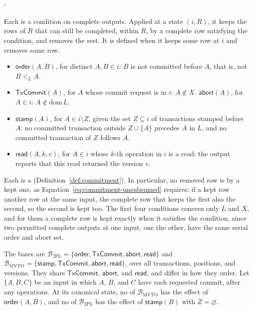 \paragraph{\Commitments.}
Each \commitment is a condition on complete outputs.  Applied at a state
$(i,R)$, it keeps the rows of $R$ that can still be completed, within $R$, by a
complete row satisfying the condition, and removes the rest.  It is defined
when it keeps some row at $i$ and removes some row.
\begin{itemize}
  \item $\mathsf{order}(A,B)$, for distinct $A,B\in i$: $B$ is not committed
        before $A$, that is, not $B<_L A$.
  \item $\mathsf{TxCommit}(A)$, for $A$ whose commit request is in $i$:
        $A\notin X$.\quad
        $\mathsf{abort}(A)$, for $A\in i$: $A\notin\mathrm{dom}\,L$.
  \item $\mathsf{stamp}(A)$, for $A\in i\setminus Z$, given the set $Z\subseteq
        i$ of transactions stamped before $A$: no committed transaction outside
        $Z\cup\{A\}$ precedes $A$ in $L$, and no committed transaction of $Z$
        follows $A$.
  \item $\mathsf{read}(A,k,v)$, for $A\in i$ whose $k$-th operation in $i$ is a
        read: the output reports that this read returned the version $v$.
\end{itemize}
Each is a \commitment (Definition~\ref{def:commitment}).  In particular, no
removed row is \outrelpast by a kept one, as
Equation~\ref{eq:commitment-unsubsumed} requires: if a kept row \outrel another
row at the same input, the complete row that keeps the first also \outrel the
second, so the second is kept too.  The first four conditions concern only $L$
and $X$, and for them a complete row is kept exactly when it satisfies the
condition, since two permitted complete outputs at one input, one
\outrelpart the other, have the same serial order and abort set.

The bases are
$\mathcal B_{\mathrm{2PL}}=\{\mathsf{order},\mathsf{TxCommit},\mathsf{abort},\mathsf{read}\}$
and
$\mathcal B_{\mathrm{MVTO}}=\{\mathsf{stamp},\mathsf{TxCommit},\mathsf{abort},\mathsf{read}\}$,
over all transactions, positions, and versions.  They share
$\mathsf{TxCommit}$, $\mathsf{abort}$, and $\mathsf{read}$, and differ in how
they order.  Let $\{A,B,C\}$ be an input in which $A$, $B$, and $C$ have each
requested commit, after any operations.  At its canonical state, no \commitment
of $\mathcal B_{\mathrm{MVTO}}$ has the effect of $\mathsf{order}(A,B)$, and no
\commitment of $\mathcal B_{\mathrm{2PL}}$ has the effect of $\mathsf{stamp}(B)$
with $Z=\varnothing$.

